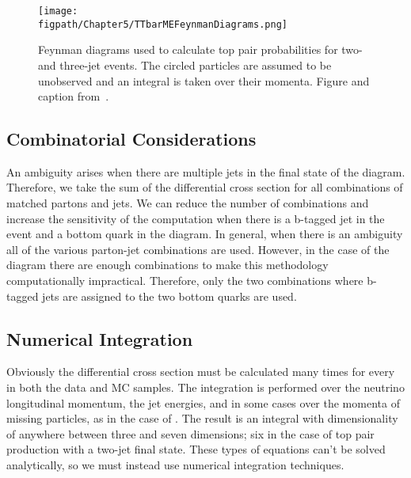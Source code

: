\begin{figure}[!hbt]
    \centering
    \texttt{[image: \\figpath/Chapter5/TTbarMEFeynmanDiagrams.png]}
    \caption{Feynman diagrams used to calculate top pair probabilities for two- and three-jet events. The circled particles are assumed to be unobserved and an integral is taken over their momenta. Figure and caption from~\cite{Dong2008}.}
    \label{fig:TTbarMEFeynmanDiagrams}
\end{figure}

\subsection{Combinatorial Considerations}

An ambiguity arises when there are multiple jets in the final state of the diagram.
Therefore, we take the sum of the differential cross section for all combinations of matched partons and jets.
We can reduce the number of combinations and increase the sensitivity of the computation when there is a b-tagged jet in the event and a bottom quark in the diagram.
In general, when there is an ambiguity all of the various parton-jet combinations are used.
However, in the case of the \ttbar diagram there are enough combinations to make this methodology computationally impractical.
Therefore, only the two combinations where b-tagged jets are assigned to the two bottom quarks are used.

\subsection{Numerical Integration}

Obviously the differential cross section must be calculated many times for every in both the data and MC samples.
The integration is performed over the neutrino longitudinal momentum, the jet energies, and in some cases over the momenta of missing particles, as in the case of \ttbar.
The result is an integral with dimensionality of anywhere between three and seven dimensions; six in the case of top pair production with a two-jet final state.
These types of equations can't be solved analytically, so we must instead use numerical integration techniques. 

